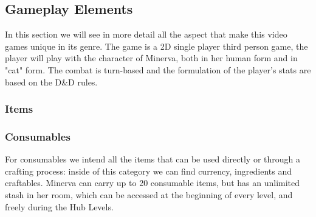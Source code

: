 \subsection{Gameplay Elements}

In this section we will see in more detail all the aspect that make this video games unique in its genre. The game is a 2D single player third person game, the player will play with the character of Minerva, both in her human form and in "cat" form. The combat is turn-based and the formulation of the player's stats are based on the D\&D rules.



\subsubsection{Items}











\pagebreak
\subsubsection{Consumables}
For consumables we intend all the items that can be used directly or through a crafting process: inside of this category we can find currency, ingredients and craftables. Minerva can carry up to 20 consumable items, but has an unlimited stash in her room, which can be accessed at the beginning of every level, and freely during the Hub Levels. 









